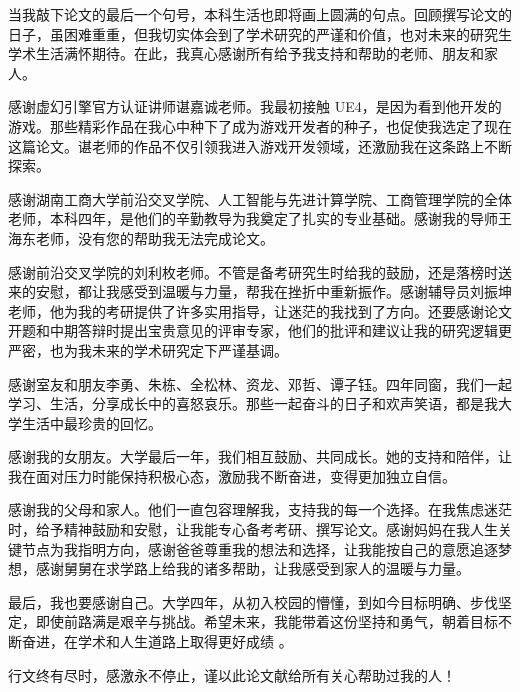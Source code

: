 \begin{acknowledgements} 

当我敲下论文的最后一个句号，本科生活也即将画上圆满的句点。回顾撰写论文的日子，虽困难重重，但我切实体会到了学术研究的严谨和价值，也对未来的研究生学术生活满怀期待。在此，我真心感谢所有给予我支持和帮助的老师、朋友和家人。

感谢虚幻引擎官方认证讲师谌嘉诚老师。我最初接触 UE4，是因为看到他开发的游戏。那些精彩作品在我心中种下了成为游戏开发者的种子，也促使我选定了现在这篇论文。谌老师的作品不仅引领我进入游戏开发领域，还激励我在这条路上不断探索。

感谢湖南工商大学前沿交叉学院、人工智能与先进计算学院、工商管理学院的全体老师，本科四年，是他们的辛勤教导为我奠定了扎实的专业基础。感谢我的导师王海东老师，没有您的帮助我无法完成论文。

感谢前沿交叉学院的刘利枚老师。不管是备考研究生时给我的鼓励，还是落榜时送来的安慰，都让我感受到温暖与力量，帮我在挫折中重新振作。感谢辅导员刘振坤老师，他为我的考研提供了许多实用指导，让迷茫的我找到了方向。还要感谢论文开题和中期答辩时提出宝贵意见的评审专家，他们的批评和建议让我的研究逻辑更严密，也为我未来的学术研究定下严谨基调。

感谢室友和朋友李勇、朱栋、全松林、资龙、邓哲、谭子钰。四年同窗，我们一起学习、生活，分享成长中的喜怒哀乐。那些一起奋斗的日子和欢声笑语，都是我大学生活中最珍贵的回忆。

感谢我的女朋友。大学最后一年，我们相互鼓励、共同成长。她的支持和陪伴，让我在面对压力时能保持积极心态，激励我不断奋进，变得更加独立自信。

感谢我的父母和家人。他们一直包容理解我，支持我的每一个选择。在我焦虑迷茫时，给予精神鼓励和安慰，让我能专心备考考研、撰写论文。感谢妈妈在我人生关键节点为我指明方向，感谢爸爸尊重我的想法和选择，让我能按自己的意愿追逐梦想，感谢舅舅在求学路上给我的诸多帮助，让我感受到家人的温暖与力量。

最后，我也要感谢自己。大学四年，从初入校园的懵懂，到如今目标明确、步伐坚定，即使前路满是艰辛与挑战。希望未来，我能带着这份坚持和勇气，朝着目标不断奋进，在学术和人生道路上取得更好成绩 。

行文终有尽时，感激永不停止，谨以此论文献给所有关心帮助过我的人！

\end{acknowledgements}
